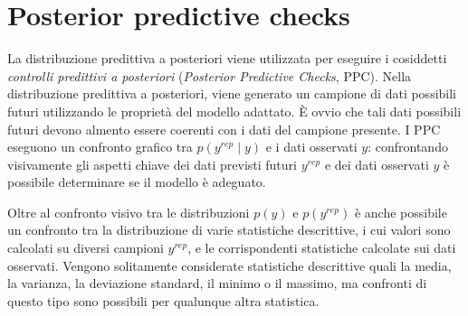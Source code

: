 \documentclass[
  11pt,
]{krantz}
\theoremstyle{definition}
\theoremstyle{definition}
\theoremstyle{definition}
\theoremstyle{definition}
\theoremstyle{remark}
\begin{document}
\hypertarget{posterior-predictive-checks}{%
\section{Posterior predictive checks}\label{posterior-predictive-checks}}

La distribuzione predittiva a posteriori viene utilizzata per eseguire i cosiddetti \emph{controlli predittivi a posteriori} (\emph{Posterior Predictive Checks}, PPC). Nella distribuzione predittiva a posteriori, viene generato un campione di dati possibili futuri utilizzando le proprietà del modello adattato. È ovvio che tali dati possibili futuri devono almento essere coerenti con i dati del campione presente. I PPC eseguono un confronto grafico tra \(p(y^{rep} \mid y)\) e i dati osservati \(y\): confrontando visivamente gli aspetti chiave dei dati previsti futuri \(y^{rep}\) e dei dati osservati \(y\) è possibile determinare se il modello è adeguato.

Oltre al confronto visivo tra le distribuzioni \(p(y)\) e \(p(y^{rep})\) è anche possibile un confronto tra la distribuzione di varie statistiche descrittive, i cui valori sono calcolati su diversi campioni \(y^{rep}\), e le corrispondenti statistiche calcolate sui dati osservati. Vengono solitamente considerate statistiche descrittive quali la media, la varianza, la deviazione standard, il minimo o il massimo, ma confronti di questo tipo sono possibili per qualunque altra statistica.
\end{document}
